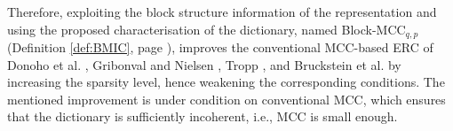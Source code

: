\begin{remark}
\label{Rmrk:DontKnow1}
Therefore, exploiting the block structure information of the representation and using the proposed characterisation of the dictionary, named Block-MCC$_{q,p}$ (Definition \ref{def:BMIC}, page \pageref{def:BMIC}), improves the conventional MCC-based ERC of Donoho et al. \cite{Donoho2001,Donoho2003,Donoho2006a}, Gribonval and Nielsen \cite{Gribonval2003,Gribonval2007}, Tropp \cite{Tropp2004}, and Bruckstein et al. \cite{Bruckstein2009} by increasing the sparsity level, hence weakening the corresponding conditions.
The mentioned improvement is under condition on conventional MCC, which ensures that the dictionary is sufficiently incoherent, i.e., MCC is small enough.
\end{remark}